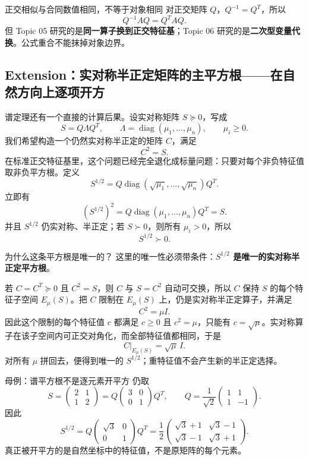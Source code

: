 \documentclass[11pt,a4paper]{ctexart}
\newcommand{\kw}[1]{\textbf{\color{deep}#1}}
\begin{document}
\begin{warnbox}{正交相似与合同数值相同，不等于对象相同}
对正交矩阵 $Q$，$Q^{-1}=Q^T$，所以
\[
Q^{-1}AQ=Q^TAQ.
\]
但 Topic 05 研究的是\kw{同一算子换到正交特征基}；Topic 06 研究的是\kw{二次型变量代换}。公式重合不能抹掉对象边界。
\end{warnbox}

\subsection{Extension：实对称半正定矩阵的主平方根——在自然方向上逐项开方}

谱定理还有一个直接的计算后果。设实对称矩阵 $S\succeq0$，写成
\[
S=Q\Lambda Q^T,
\qquad
\Lambda=\operatorname{diag}(\mu_1,\dots,\mu_n),
\qquad \mu_i\ge0.
\]
我们希望构造一个仍然实对称半正定的矩阵 $C$，满足
\[
C^2=S.
\]
在标准正交特征基里，这个问题已经完全退化成标量问题：只要对每个非负特征值取非负平方根。定义
\[
\boxed{
S^{1/2}
=Q\operatorname{diag}(\sqrt{\mu_1},\dots,\sqrt{\mu_n})Q^T.
}
\]
立即有
\[
(S^{1/2})^2
=Q\operatorname{diag}(\mu_1,\dots,\mu_n)Q^T
=S.
\]
并且 $S^{1/2}$ 仍实对称、半正定；若 $S\succ0$，则所有 $\mu_i>0$，所以
\[
\boxed{S^{1/2}\succ0.}
\]

\begin{corebox}{为什么这条平方根是唯一的？}
这里的唯一性必须带条件：\kw{$S^{1/2}$ 是唯一的实对称半正定平方根}。

若 $C=C^T\succeq0$ 且 $C^2=S$，则 $C$ 与 $S=C^2$ 自动可交换，所以 $C$ 保持 $S$ 的每个特征子空间 $E_\mu(S)$。把 $C$ 限制在 $E_\mu(S)$ 上，仍是实对称半正定算子，并满足
\[
C^2=\mu I.
\]
因此这个限制的每个特征值 $c$ 都满足 $c\ge0$ 且 $c^2=\mu$，只能有 $c=\sqrt\mu$。实对称算子在该子空间内可正交对角化，而全部特征值都相同，于是
\[
C\vert_{E_\mu(S)}=\sqrt\mu\,I.
\]
对所有 $\mu$ 拼回去，便得到唯一的 $S^{1/2}$；重特征值不会产生新的半正定选择。
\end{corebox}

\begin{examplebox}{母例：谱平方根不是逐元素开平方}
仍取
\[
S=\begin{pmatrix}2&1\\1&2\end{pmatrix}
=Q\begin{pmatrix}3&0\\0&1\end{pmatrix}Q^T,
\qquad
Q=\frac1{\sqrt2}\begin{pmatrix}1&1\\1&-1\end{pmatrix}.
\]
因此
\[
S^{1/2}
=Q\begin{pmatrix}\sqrt3&0\\0&1\end{pmatrix}Q^T
=\frac12
\begin{pmatrix}
\sqrt3+1&\sqrt3-1\\
\sqrt3-1&\sqrt3+1
\end{pmatrix}.
\]
真正被开平方的是自然坐标中的特征值，不是原矩阵的每个元素。
\end{examplebox}
\end{document}
